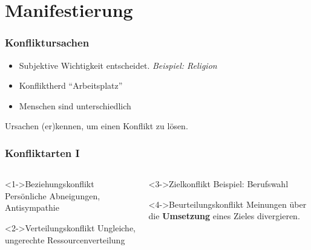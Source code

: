 \documentclass[
	ngerman,
	xcolor=dvipsnames,
	11pt
	]{beamer}
\newenvironment{annot}{\begin{block}{}}{\end{block}}
\begin{document}
\section{Manifestierung}
\begin{frame}
	\frametitle{Konfliktursachen}

	\begin{itemize}
		\item Subjektive Wichtigkeit entscheidet. \textit{Beispiel: Religion}
		\item Konfliktherd ``Arbeitsplatz''
		\item Menschen sind unterschiedlich
	\end{itemize}

	\hfill
	\pause
	\begin{annot}
		Ursachen (er)kennen, um einen Konflikt zu lösen.
	\end{annot}
\end{frame}

\begin{frame}
	\frametitle{Konfliktarten I}	

	\begin{columns}[t]
		\begin{column}{.5\textwidth}
			\begin{exampleblock}<1->{Beziehungskonflikt}
				Persönliche Abneigungen, Antisympathie
			\end{exampleblock}

			\begin{exampleblock}<2->{Verteilungskonflikt}
				Ungleiche, ungerechte Ressourcenverteilung	
			\end{exampleblock}	
		\end{column}
	
		\begin{column}{.5\textwidth}
			\begin{exampleblock}<3->{Zielkonflikt}
				Beispiel: Berufswahl
			\end{exampleblock}

			\begin{exampleblock}<4->{Beurteilungskonflikt}
				Meinungen über die \textbf{Umsetzung} eines Zieles divergieren.
			\end{exampleblock}
		\end{column}
	\end{columns}
\end{frame}
\end{document}
